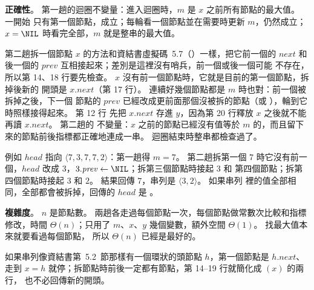 \begin{pastsoln}
\textbf{正確性}。 第一趟的迴圈不變量：進入迴圈時，$m$ 是 $x$ 之前所有節點的最大值。 一開始
只有第一個節點，成立；每輪看一個節點並在需要時更新 $m$，仍然成立；$x = \NIL$ 時看完全部，$m$
就是整串的最大值。

第二趟拆一個節點 $x$ 的方法和資結書虛擬碼~5.7（）一樣，把它前一個的
$\mathit{next}$ 和後一個的 $\mathit{prev}$ 互相接起來；差別是這裡沒有哨兵，前一個或後一個可能
不存在，所以第 14、18 行要先檢查。 $x$ 沒有前一個節點時，它就是目前的第一個節點，拆掉後新的
開頭是 $x.\mathit{next}$（第 17 行）。 連續好幾個節點都是 $m$ 時也對：前一個被拆掉之後，下一個
節點的 $\mathit{prev}$ 已經改成更前面那個沒被拆的節點（或 \NIL），輪到它時照樣接得起來。 第 12 行
先把 $x.\mathit{next}$ 存進 $y$，因為第 20 行釋放 $x$ 之後就不能再讀 $x.\mathit{next}$。 第二趟的
不變量：$x$ 之前的節點已經沒有值等於 $m$ 的，而且留下來的節點前後指標都正確地連成一串。
迴圈結束時整串都檢查過了。

例如 $\mathit{head}$ 指向 $\langle 7, 3, 7, 7, 2 \rangle$：第一趟得 $m = 7$。 第二趟拆第一個 $7$
時它沒有前一個，$\mathit{head}$ 改成 $3$，$3.\mathit{prev} \gets \NIL$；拆第三個節點時接起 $3$ 和
第四個節點；拆第四個節點時接起 $3$ 和 $2$。 結果回傳 $7$，串列是 $\langle 3, 2 \rangle$。 如果串列
裡的值全部相同，全部都會被拆掉，回傳的 $\mathit{head}$ 是 \NIL。

\textbf{複雜度}。 $n$ 是節點數。 兩趟各走過每個節點一次，每個節點做常數次比較和指標修改，時間
$\Theta(n)$；只用了 $m$、$x$、$y$ 幾個變數，額外空間 $\Theta(1)$。 找最大值本來就要看過每個節點，
所以 $\Theta(n)$ 已經是最好的。

如果串列像資結書第~5.2~節那樣有一個環狀的頭節點 $h$，第一個節點是 $h.\mathit{next}$、走到
$x = h$ 就停；拆節點時前後一定都有節點，第 14--19 行就簡化成 $(x)$ 的兩行，
也不必回傳新的開頭。
\end{pastsoln}

